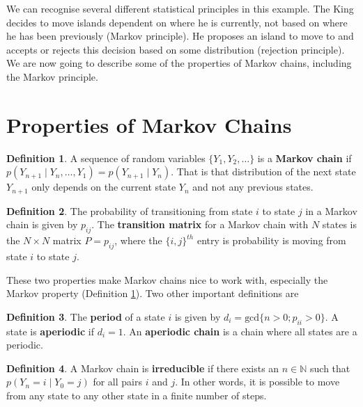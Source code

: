 \documentclass[
]{book}
\theoremstyle{definition}
\newtheorem{definition}{Definition}[chapter]
\theoremstyle{definition}
\theoremstyle{definition}
\theoremstyle{definition}
\theoremstyle{remark}
\begin{document}
We can recognise several different statistical principles in this example. The King decides to move islands dependent on where he is currently, not based on where he has been previously (Markov principle). He proposes an island to move to and accepts or rejects this decision based on some distribution (rejection principle). We are now going to describe some of the properties of Markov chains, including the Markov principle.

\hypertarget{properties-of-markov-chains}{%
\section{Properties of Markov Chains}\label{properties-of-markov-chains}}

\begin{definition}
\protect\hypertarget{def:Markov}{}\label{def:Markov}A sequence of random variables \(\{Y_1, Y_2, \ldots\}\) is a \textbf{Markov chain} if \(p(Y_{n+1} \mid Y_{n}, \ldots, Y_1) = p(Y_{n+1} \mid Y_{n})\). That is that distribution of the next state \(Y_{n+1}\) only depends on the current state \(Y_n\) and not any previous states.
\end{definition}

\begin{definition}
The probability of transitioning from state \(i\) to state \(j\) in a Markov chain is given by \(p_{ij}\). The \textbf{transition matrix} for a Markov chain with \(N\) states is the \(N \times N\) matrix \(P = p_{ij}\), where the \(\{i, j\}^{th}\) entry is probability is moving from state \(i\) to state \(j\).
\end{definition}

These two properties make Markov chains nice to work with, especially the Markov property (Definition \ref{def:Markov}). Two other important definitions are

\begin{definition}
The \textbf{period }of a state \(i\) is given by \(d_i = \textrm{gcd}\{n > 0; p_{ii} > 0 \}\). A state is \textbf{aperiodic} if \(d_i = 1\). An \textbf{aperiodic chain} is a chain where all states are a periodic.
\end{definition}

\begin{definition}
A Markov chain is \textbf{irreducible} if there exists an \(n \in \mathbb{N}\) such that \(p(Y_n = i \mid Y_0 = j)\) for all pairs \(i\) and \(j\). In other words, it is possible to move from any state to any other state in a finite number of steps.
\end{definition}
\end{document}
